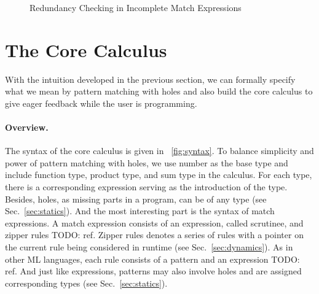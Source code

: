 \documentclass[runningheads,envcountsame,a4paper]{llncs}
\newcommand{\todo}[1]{{\color{red} TODO: #1}}
\begin{document}
\begin{figure}[ht]
  \centering
  \hspace*{\fill}%
  \hfill%
  \hspace*{\fill}%
  \caption{Redundancy Checking in Incomplete Match Expressions}
  \label{fig:exh-red-hole}
\end{figure}

\section{The Core Calculus}
With the intuition developed in the previous section, we can formally specify
what we mean by pattern matching with holes and also build the core calculus to
give eager feedback while the user is programming.


\paragraph{Overview.}
The syntax of the core calculus is given in \figurename~\ref{fig:syntax}. To
balance simplicity and power of pattern matching with holes, we use number as
the base type and include function type, product type, and sum type in the
calculus. For each type, there is a corresponding expression serving as the
introduction of the type. Besides, holes, as missing parts in a program, can be
of any type (see Sec.~\ref{sec:statics}). And the most interesting part is the
syntax of match expressions. A match expression consists of an expression,
called scrutinee, and zipper rules \todo{ref}. Zipper rules denotes a series of
rules with a pointer on the current rule being considered in runtime (see
Sec.~\ref{sec:dynamics}). As in other ML languages, each rule consists of a
pattern and an expression \todo{ref}. And just like expressions, patterns may
also involve holes and are assigned corresponding types (see Sec.~\ref{sec:statics}).
\end{document}
